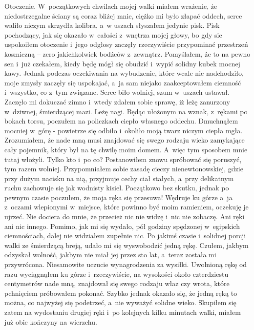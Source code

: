 Otoczenie. W~początkowych chwilach mojej walki miałem wrażenie, że niedostrzegalne ściany są coraz bliżej mnie, ciężko mi było złapać oddech, serce waliło niczym skrzydła kolibra, a~w uszach słyszałem jedynie pisk. Pisk pochodzący, jak się okazało w~całości z~wnętrza mojej głowy, bo gdy sie uspokoiłem otoczenie i~jego odgłosy zaczęły rzeczywiście przypominać przestrzeń kosmiczną -- zero jakichkolwiek bodźców z~zewnątrz. Pomyślałem, że to na pewno sen i~już czekałem, kiedy będę mógł się obudzić i~wypić solidny kubek mocnej kawy. Jednak podczas oczekiwania na wybudzenie, które wcale nie nadchodziło, moje zmysły zaczęły się uspokajać, a~ja sam niejako zaakceptowałem ciemność i~wszystko, co z~tym związane. Serce biło wolniej, szum w~uszach ustawał. Zaczęło mi dokuczać zimno i~wtedy zdałem sobie sprawę, iż leżę zanurzony w~dziwnej, śmierdzącej mazi. Leżę nagi. Będąc ułożonym na wznak, z~rękami po bokach torsu, poczułem na policzkach ciepło własnego oddechu. Dmuchnąłem mocniej w~górę - powietrze się odbiło i~okoliło moją twarz niczym ciepła mgła. Zrozumiałem, że nade mną musi znajdować się swego rodzaju wieko zamykające cały pojemnik, który był na tę chwilę moim domem. A~więc tym sposobem mnie tutaj włożyli. Tylko kto i~po co? 
Postanowiłem znowu spróbować się poruszyć, tym razem wolniej. Przypomniałem sobie zasadę cieczy nienewtonowskiej, gdzie przy dużym nacisku na nią, przyjmuje cechy ciał stałych, a~przy delikatnym ruchu zachowuje się jak wodnisty kisiel. Początkowo bez skutku, jednak po pewnym czasie poczułem, że moja ręka się przesuwa! Wędruje ku górze a~ja z~oczami wlepionymi w~miejsce, które powinno być moim ramieniem, oczekuję je ujrzeć. Nie dociera do mnie, że przecież nic nie widzę i~nic nie zobaczę. Ani ręki ani nic innego. Pomimo, jak mi się wydało, pół godziny spędzonej w~egipskich ciemnościach, dalej nie widziałem zupełnie nic. Po jakimś czasie i~solidnej porcji walki ze śmierdzącą breją, udało mi się wyswobodzić jedną rękę. Czułem, jakbym odzyskał wolność, jakbym nie miał jej przez sto lat, a~teraz została mi przywrócona. Niesamowite uczucie wynagrodzenia za wysiłki. Uwolnioną rękę od razu wyciągnąłem ku górze i~rzeczywiście, na wysokości około czterdziestu centymetrów nade mną, znajdował się swego rodzaju właz czy wrota, które pchnięciem próbowałem pokonać. Szybko jednak okazało się, że jedną ręką to można, co najwyżej się podetrzeć, a~nie wyważyć solidne wieko. Skupiłem się zatem na wydostaniu drugiej ręki i~po kolejnych kilku minutach walki, miałem już obie kończyny na wierzchu. 

